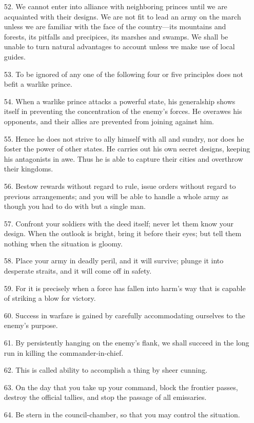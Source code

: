 \documentclass[11pt,openany]{memoir}
\newcommand{\enumeratemargin}{1.30em}
\begin{document}
\begin{enumerate}[leftmargin=\enumeratemargin]
\item[52.] We cannot enter into alliance with neighboring princes until we are acquainted with their designs. We are not fit to lead an army on the march unless we are familiar with the face of the country---its mountains and forests, its pitfalls and precipices, its marshes and swamps. We shall be unable to turn natural advantages to account unless we make use of local guides.
\item[53.] To be ignored of any one of the following four or five principles does not befit a warlike prince.
\item[54.] When a warlike prince attacks a powerful state, his generalship shows itself in preventing the concentration of the enemy's forces. He overawes his opponents, and their allies are prevented from joining against him.
\item[55.] Hence he does not strive to ally himself with all and sundry, nor does he foster the power of other states. He carries out his own secret designs, keeping his antagonists in awe. Thus he is able to capture their cities and overthrow their kingdoms.
\item[56.] Bestow rewards without regard to rule, issue orders without regard to previous arrangements; and you will be able to handle a whole army as though you had to do with but a single man.
\item[57.] Confront your soldiers with the deed itself; never let them know your design. When the outlook is bright, bring it before their eyes; but tell them nothing when the situation is gloomy.
\item[58.] Place your army in deadly peril, and it will survive; plunge it into desperate straits, and it will come off in safety.
\item[59.] For it is precisely when a force has fallen into harm's way that is capable of striking a blow for victory.
\item[60.] Success in warfare is gained by carefully accommodating ourselves to the enemy's purpose.
\item[61.] By persistently hanging on the enemy's flank, we shall succeed in the long run in killing the commander-in-chief.
\item[62.] This is called ability to accomplish a thing by sheer cunning.
\item[63.] On the day that you take up your command, block the frontier passes, destroy the official tallies, and stop the passage of all emissaries.
\item[64.] Be stern in the council-chamber, so that you may control the situation.

\end{enumerate}
\end{document}
